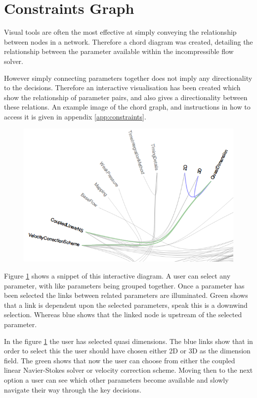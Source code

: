 \documentclass[11pt, a4paper]{report}
\begin{document}
\section{Constraints Graph}
\label{sec:constraint_graph}
Visual tools are often the most effective at simply conveying the relationship between nodes in a network. Therefore a chord diagram was created, detailing the relationship between the parameter available within the incompressible flow solver. 

However simply connecting parameters together does not imply any directionality to the decisions. Therefore an interactive visualisation has been created which show the relationship of parameter pairs, and also gives a directionality between these relations. An example image of the chord graph, and instructions in how to access it is given in appendix \ref{app:constraints}.

\begin{figure}[htb!]
 \centering
 \includegraphics[width=.95\linewidth,  clip=true, trim = 0cm 0cm 0cm 0cm]{constraint_directionality}
 \label{fig:constrain_directionality}
\end{figure}

Figure \ref{fig:constrain_directionality} shows a snippet of this interactive diagram. A user can select any parameter, with like parameters being grouped together. Once a parameter has been selected the links between related parameters are illuminated. Green shows that a link is dependent upon the selected parameters, speak this is a downwind selection. Whereas blue shows that the linked node is upstream of the selected parameter.

In the figure \ref{fig:constrain_directionality} the user has selected quasi dimensions. The blue links show that in order to select this the user should have chosen either 2D or 3D as the dimension field. The green shows that now the user can choose from either the coupled linear Navier-Stokes solver or velocity correction scheme. Moving then to the next option a user can see which other parameters become available and slowly navigate their way through the key decisions.
\end{document}
